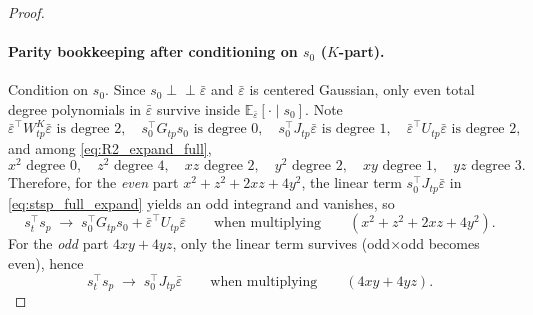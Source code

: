 \begin{proof}
\paragraph{Parity bookkeeping after conditioning on $s_0$ ($K$-part).}
Condition on $s_0$. Since $s_0 \perp\!\!\!\perp \bar\varepsilon$ and $\bar\varepsilon$ is centered Gaussian,
only even total degree polynomials in $\bar\varepsilon$ survive inside $\mathbb E_{\bar\varepsilon}[\cdot\mid s_0]$.
Note
\[
\bar\varepsilon^\top W^K_{tp}\bar\varepsilon \text{ is degree }2,\quad
s_0^\top G_{tp}s_0 \text{ is degree }0,\quad
s_0^\top J_{tp}\bar\varepsilon \text{ is degree }1,\quad
\bar\varepsilon^\top U_{tp}\bar\varepsilon \text{ is degree }2,
\]
and among \eqref{eq:R2_expand_full},
\[
x^2 \text{ degree }0,\quad
z^2 \text{ degree }4,\quad
xz \text{ degree }2,\quad
y^2 \text{ degree }2,\quad
xy \text{ degree }1,\quad
yz \text{ degree }3.
\]
Therefore, for the \emph{even} part $x^2+z^2+2xz+4y^2$, the linear term
$s_0^\top J_{tp}\bar\varepsilon$ in \eqref{eq:stsp_full_expand} yields an odd integrand and vanishes, so
\[
s_t^\top s_p \;\to\; s_0^\top G_{tp}s_0+\bar\varepsilon^\top U_{tp}\bar\varepsilon
\qquad\text{when multiplying}\qquad (x^2+z^2+2xz+4y^2).
\]
For the \emph{odd} part $4xy+4yz$, only the linear term survives (odd$\times$odd becomes even), hence
\[
s_t^\top s_p \;\to\; s_0^\top J_{tp}\bar\varepsilon
\qquad\text{when multiplying}\qquad (4xy+4yz).
\]


\end{proof}
